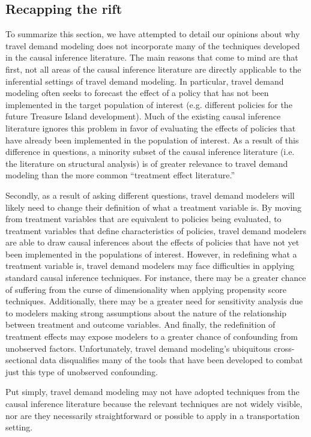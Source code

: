 \subsection{Recapping the rift}
\label{sec:disconnect_summary}
To summarize this section, we have attempted to detail our opinions about why travel demand modeling does not incorporate many of the techniques developed in the causal inference literature. The main reasons that come to mind are that first, not all areas of the causal inference literature are directly applicable to the inferential settings of travel demand modeling. In particular, travel demand modeling often seeks to forecast the effect of a policy that has not been implemented in the target population of interest (e.g. different policies for the future Treasure Island development). Much of the existing causal inference literature ignores this problem in favor of evaluating the effects of policies that have already been implemented in the population of interest. As a result of this difference in questions, a minority subset of the causal inference literature (i.e. the literature on structural analysis) is of greater relevance to travel demand modeling than the more common ``treatment effect literature.''

Secondly, as a result of asking different questions, travel demand modelers will likely need to change their definition of what a treatment variable is. By moving from treatment variables that are equivalent to policies being evaluated, to treatment variables that define characteristics of policies, travel demand modelers are able to draw causal inferences about the effects of policies that have not yet been implemented in the populations of interest. However, in redefining what a treatment variable is, travel demand modelers may face difficulties in applying standard causal inference techniques. For instance, there may be a greater chance of suffering from the curse of dimensionality when applying propensity score techniques. Additionally, there may be a greater need for sensitivity analysis due to modelers making strong assumptions about the nature of the relationship between treatment and outcome variables. And finally, the redefinition of treatment effects may expose modelers to a greater chance of confounding from unobserved factors. Unfortunately, travel demand modeling's ubiquitous cross-sectional data disqualifies many of the tools that have been developed to combat just this type of unobserved confounding.

Put simply, travel demand modeling may not have adopted techniques from the causal inference literature because the relevant techniques are not widely visible, nor are they necessarily straightforward or possible to apply in a transportation setting.

